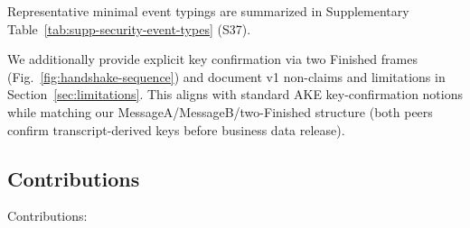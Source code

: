 \documentclass[10pt,journal,compsoc]{IEEEtran}
\begin{document}
Representative minimal event typings are summarized in
Supplementary Table~\ref{tab:supp-security-event-types} (S37).

We additionally provide explicit key confirmation via two Finished
frames (Fig.~\ref{fig:handshake-sequence}) and document v1 non-claims and
limitations in Section~\ref{sec:limitations}.
This aligns with standard AKE key-confirmation notions while matching our
MessageA/MessageB/two-Finished structure (both peers confirm
transcript-derived keys before business data release).

\subsection{Contributions}\label{a.-contributions}

Contributions:
\end{document}
